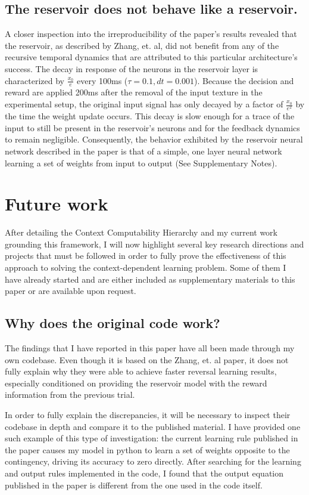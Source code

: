\documentclass[]{article}
\begin{document}
\subsection{The reservoir does not behave like a reservoir.}
A closer inspection into the irreproducibility of the paper's results revealed that the reservoir, as described by Zhang, et. al, did not benefit from any of the recursive temporal dynamics that are attributed to this particular architecture's success.  The decay in response of the neurons in the reservoir layer is characterized by $\frac{x_0}{e}$ every 100ms ($\tau=0.1, dt=0.001$).  Because the decision and reward are applied 200ms after the removal of the input texture in the experimental setup, the original input signal has only decayed by a factor of $\frac{x_0}{e^2}$ by the time the weight update occurs.  This decay is slow enough for a trace of the input to still be present in the reservoir's neurons and for the feedback dynamics to remain negligible.  Consequently, the behavior exhibited by the reservoir neural network described in the paper is that of a simple, one layer neural network learning a set of weights from input to output (See Supplementary Notes).



\section{Future work}
After detailing the Context Computability Hierarchy and my current work grounding this framework, I will now highlight several key research directions and projects that must be followed in order to fully prove the effectiveness of this approach to solving the context-dependent learning problem.  Some of them I have already started and are either included as supplementary materials to this paper or are available upon request.

\subsection{Why does the original code work?}
The findings that I have reported in this paper have all been made through my own codebase.  Even though it is based on the Zhang, et. al paper, it does not fully explain why they were able to achieve faster reversal learning results, especially conditioned on providing the reservoir model with the reward information from the previous trial.

In order to fully explain the discrepancies, it will be necessary to inspect their codebase in depth and compare it to the published material.  I have provided one such example of this type of investigation: the current learning rule published in the paper causes my model in python to learn a set of weights opposite to the contingency, driving its accuracy to zero directly.  After searching for the learning and output rules implemented in the code, I found that the output equation published in the paper is different from the one used in the code itself.
\end{document}
